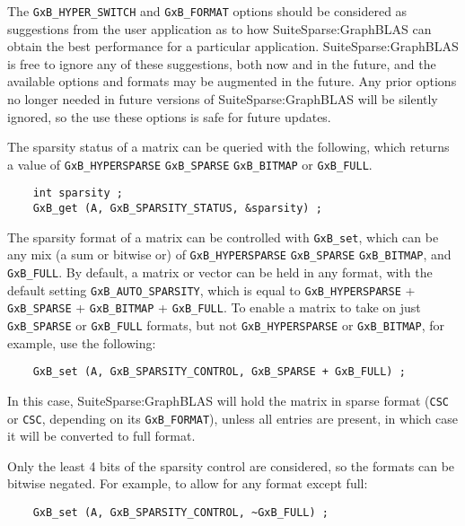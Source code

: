 \documentclass[12pt]{article}
\begin{document}
The \verb'GxB_HYPER_SWITCH' and \verb'GxB_FORMAT' options should be considered as
suggestions from the user application as to how SuiteSparse:GraphBLAS can
obtain the best performance for a particular application.
SuiteSparse:GraphBLAS is free to ignore any of these suggestions, both now and
in the future, and the available options and formats may be augmented in the
future.  Any prior options no longer needed in future versions of
SuiteSparse:GraphBLAS will be silently ignored, so the use these options is
safe for future updates.

The sparsity status of a matrix can be queried with the following, which
returns a value of \verb'GxB_HYPERSPARSE' \verb'GxB_SPARSE' \verb'GxB_BITMAP'
or \verb'GxB_FULL'.

{\footnotesize
\begin{verbatim}
    int sparsity ;
    GxB_get (A, GxB_SPARSITY_STATUS, &sparsity) ; \end{verbatim}}

The sparsity format of a matrix can be controlled with \verb'GxB_set', which
can be any mix (a sum or bitwise or) of \verb'GxB_HYPERSPARSE'
\verb'GxB_SPARSE' \verb'GxB_BITMAP', and \verb'GxB_FULL'.  By default, a matrix
or vector can be held in any format, with the default setting
\verb'GxB_AUTO_SPARSITY', which is equal to \verb'GxB_HYPERSPARSE' +
\verb'GxB_SPARSE' + \verb'GxB_BITMAP' + \verb'GxB_FULL'.  To enable a matrix to
take on just \verb'GxB_SPARSE' or \verb'GxB_FULL' formats, but not
\verb'GxB_HYPERSPARSE' or \verb'GxB_BITMAP', for example, use the following:

{\footnotesize
\begin{verbatim}
    GxB_set (A, GxB_SPARSITY_CONTROL, GxB_SPARSE + GxB_FULL) ; \end{verbatim}}

In this case, SuiteSparse:GraphBLAS will hold the matrix in sparse format
(\verb'CSC' or \verb'CSC', depending on its \verb'GxB_FORMAT'), unless all
entries are present, in which case it will be converted to full format.

Only the least 4 bits of the sparsity control are considered, so the
formats can be bitwise negated.  For example, to allow for any format
except full:

{\footnotesize
\begin{verbatim}
    GxB_set (A, GxB_SPARSITY_CONTROL, ~GxB_FULL) ; \end{verbatim}}

\end{document}
